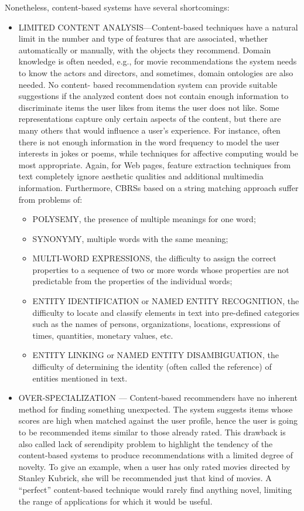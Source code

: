 Nonetheless, content-based systems have several shortcomings:

\begin{itemize}
	\item LIMITED CONTENT ANALYSIS—Content-based techniques have a natural limit in the number and type of features that are associated, whether automatically or manually, with the objects they recommend. Domain knowledge is often needed, e.g., for movie recommendations the system needs to know the actors and directors, and sometimes, domain ontologies are also needed. No content- based recommendation system can provide suitable suggestions if the analyzed content does not contain enough information to discriminate items the user likes from items the user does not like. Some representations capture only certain aspects of the content, but there are many others that would influence a user’s experience. For instance, often there is not enough information in the word frequency to model the user interests in jokes or poems, while techniques for affective computing would be most appropriate. Again, for Web pages, feature extraction techniques from text completely ignore aesthetic qualities and additional multimedia information. Furthermore, CBRSs based on a string matching approach suffer from problems of:
	\begin{itemize}
		\item POLYSEMY, the presence of multiple meanings for one word;
		\item SYNONYMY, multiple words with the same meaning;
		\item MULTI-WORD EXPRESSIONS, the difficulty to assign the correct properties to
		a sequence of two or more words whose properties are not predictable from
		the properties of the individual words;
		\item ENTITY IDENTIFICATION or NAMED ENTITY RECOGNITION, the difficulty
		to locate and classify elements in text into pre-defined categories such as the names of persons, organizations, locations, expressions of times, quantities, monetary values, etc.
		\item ENTITY LINKING or NAMED ENTITY DISAMBIGUATION, the difficulty of determining the identity (often called the reference) of entities mentioned in text.
	\end{itemize}
	\item OVER-SPECIALIZATION — Content-based recommenders have no inherent method for finding something unexpected. The system suggests items whose scores are high when matched against the user profile, hence the user is going to be recommended items similar to those already rated. This drawback is also called lack of serendipity problem to highlight the tendency of the content-based systems to produce recommendations with a limited degree of novelty. To give an example, when a user has only rated movies directed by Stanley Kubrick, she will be recommended just that kind of movies. A “perfect” content-based technique would rarely find anything novel, limiting the range of applications for which it would be useful.

\end{itemize}
